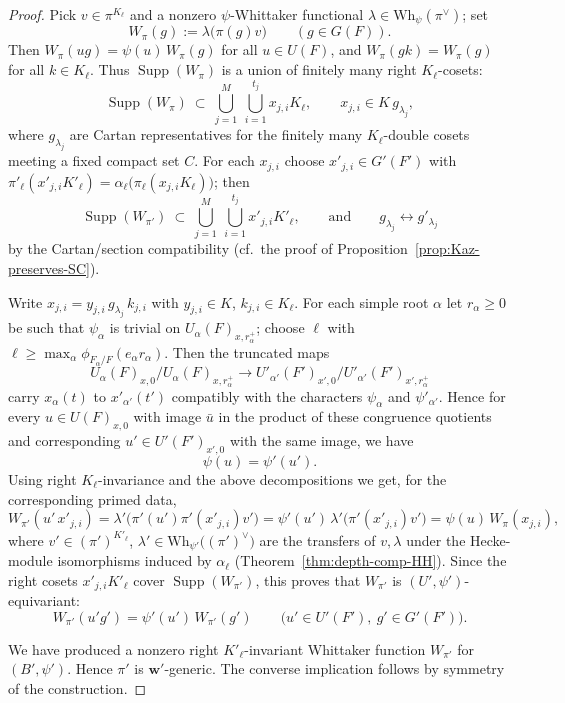 \documentclass[10pt,a4paper]{amsart}
\DeclareMathOperator{\Supp}{Supp}
\begin{document}
\begin{proof}
\smallskip

Pick \(v\in\pi^{K_\ell}\) and a nonzero \(\psi\)-Whittaker functional
\(\lambda\in\mathrm{Wh}_\psi(\pi^\vee)\); set
\[
W_\pi(g):=\lambda\bigl(\pi(g)v\bigr)\qquad(g\in G(F)).
\]
Then \(W_\pi(ug)=\psi(u)\,W_\pi(g)\) for all \(u\in U(F)\), and
\(W_\pi(gk)=W_\pi(g)\) for all \(k\in K_\ell\).
Thus \(\Supp(W_\pi)\) is a union of finitely many right \(K_\ell\)-cosets:
\[
\Supp(W_\pi)\ \subset\ \bigcup_{j=1}^M \ \bigcup_{i=1}^{t_j} x_{j,i}K_\ell,
\qquad x_{j,i}\in K\,g_{\lambda_j},
\]
where \(g_{\lambda_j}\) are Cartan representatives for the finitely many
\(K_\ell\)-double cosets meeting a fixed compact set \(C\).
For each \(x_{j,i}\) choose \(x'_{j,i}\in G'(F')\) with
\(\pi'_\ell(x'_{j,i}K'_\ell)=\alpha_\ell\bigl(\pi_\ell(x_{j,i}K_\ell)\bigr)\);
then
\[
\Supp(W_{\pi'})\ \subset\ \bigcup_{j=1}^M \ \bigcup_{i=1}^{t_j} x'_{j,i}K'_\ell,
\qquad\text{and}\qquad g_{\lambda_j}\longleftrightarrow g'_{\lambda_j}
\]
by the Cartan/section compatibility (cf.\ the proof of
Proposition~\ref{prop:Kaz-preserves-SC}). 

\smallskip
Write \(x_{j,i}=y_{j,i}\,g_{\lambda_j}\,k_{j,i}\) with \(y_{j,i}\in K\),
\(k_{j,i}\in K_\ell\). For each simple root \(\alpha\) let \(r_\alpha\ge 0\) be
such that \(\psi_\alpha\) is trivial on \(U_\alpha(F)_{x,r_\alpha^+}\);
choose \(\ell\) with
\(\ell\ge \max_\alpha \phi_{F_\alpha/F}(e_\alpha r_\alpha)\).
Then the truncated maps
\[
U_\alpha(F)_{x,0}\big/U_\alpha(F)_{x,r_\alpha^+}
\longrightarrow
U'_{\alpha'}(F')_{x',0}\big/U'_{\alpha'}(F')_{x',r_\alpha^+}
\]
carry \(x_\alpha(t)\) to \(x'_{\alpha'}(t')\) compatibly with the
characters \(\psi_\alpha\) and \(\psi'_{\alpha'}\). Hence for every
\(u\in U(F)_{x,0}\) with image \(\bar u\) in the product of these congruence
quotients and corresponding \(u'\in U'(F')_{x',0}\) with the same image,
we have
\[
\psi(u)=\psi'(u').
\]
Using right \(K_\ell\)-invariance and the above decompositions we get, for the
corresponding primed data,
\[
W_{\pi'}(u'\,x'_{j,i})
= \lambda'\bigl(\pi'(u')\pi'(x'_{j,i})v'\bigr)
= \psi'(u')\,\lambda'\bigl(\pi'(x'_{j,i})v'\bigr)
= \psi(u)\,W_{\pi}(x_{j,i}),
\]
where \(v'\in(\pi')^{K'_\ell}\), \(\lambda'\in\mathrm{Wh}_{\psi'}\bigl((\pi')^\vee\bigr)\) are the
transfers of \(v,\lambda\) under the Hecke-module isomorphisms induced by
\(\alpha_\ell\) (Theorem~\ref{thm:depth-comp-HH}). Since the right cosets
\(x'_{j,i}K'_\ell\) cover \(\Supp(W_{\pi'})\), this proves that
\(W_{\pi'}\) is \((U',\psi')\)-equivariant:
\[
W_{\pi'}(u'g')=\psi'(u')\,W_{\pi'}(g')\qquad
\bigl(u'\in U'(F'),\ g'\in G'(F')\bigr).
\]

\smallskip
We have produced a nonzero right \(K'_\ell\)-invariant Whittaker function
\(W_{\pi'}\) for \((B',\psi')\). Hence \(\pi'\) is \(\mathbf w'\)-generic.
The converse implication follows by symmetry of the construction.
\end{proof}
\end{document}
